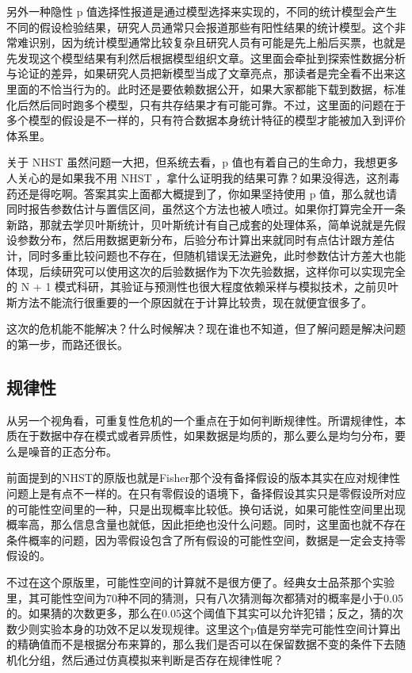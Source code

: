 \documentclass[]{tufte-book}
\begin{document}
另外一种隐性 p 值选择性报道是通过模型选择来实现的，不同的统计模型会产生不同的假设检验结果，研究人员通常只会报道那些有阳性结果的统计模型。这个非常难识别，因为统计模型通常比较复杂且研究人员有可能是先上船后买票，也就是先发现这个模型结果有利然后根据模型组织文章。这里面会牵扯到探索性数据分析与论证的差异，如果研究人员把新模型当成了文章亮点，那读者是完全看不出来这里面的不恰当行为的。此时还是要依赖数据公开，如果大家都能下载到数据，标准化后然后同时跑多个模型，只有共存结果才有可能可靠。不过，这里面的问题在于多个模型的假设是不一样的，只有符合数据本身统计特征的模型才能被加入到评价体系里。

关于 NHST 虽然问题一大把，但系统去看，p 值也有着自己的生命力，我想更多人关心的是如果我不用 NHST ，拿什么证明我的结果可靠？如果没得选，这剂毒药还是得吃啊。答案其实上面都大概提到了，你如果坚持使用 p 值，那么就也请同时报告参数估计与置信区间，虽然这个方法也被人喷过。如果你打算完全开一条新路，那就去学贝叶斯统计，贝叶斯统计有自己成套的处理体系，简单说就是先假设参数分布，然后用数据更新分布，后验分布计算出来就同时有点估计跟方差估计，同时多重比较问题也不存在，但随机错误无法避免，此时参数估计方差大也能体现，后续研究可以使用这次的后验数据作为下次先验数据，这样你可以实现完全的 N + 1 模式科研，其验证与预测性也很大程度依赖采样与模拟技术，之前贝叶斯方法不能流行很重要的一个原因就在于计算比较贵，现在就便宜很多了。

这次的危机能不能解决？什么时候解决？现在谁也不知道，但了解问题是解决问题的第一步，而路还很长。

\hypertarget{ux89c4ux5f8bux6027}{%
\subsection{规律性}\label{ux89c4ux5f8bux6027}}

从另一个视角看，可重复性危机的一个重点在于如何判断规律性。所谓规律性，本质在于数据中存在模式或者异质性，如果数据是均质的，那么要么是均匀分布，要么是噪音的正态分布。

前面提到的NHST的原版也就是Fisher那个没有备择假设的版本其实在应对规律性问题上是有点不一样的。在只有零假设的语境下，备择假设其实只是零假设所对应的可能性空间里的一种，只是出现概率比较低。换句话说，如果可能性空间里出现概率高，那么信息含量也就低，因此拒绝也没什么问题。同时，这里面也就不存在条件概率的问题，因为零假设包含了所有假设的可能性空间，数据是一定会支持零假设的。

不过在这个原版里，可能性空间的计算就不是很方便了。经典女士品茶那个实验里，其可能性空间为70种不同的猜测，只有八次猜测每次都猜对的概率是小于0.05的。如果猜的次数更多，那么在0.05这个阈值下其实可以允许犯错；反之，猜的次数少则实验本身的功效不足以发现规律。这里这个p值是穷举完可能性空间计算出的精确值而不是根据分布来算的，那么我们是否可以在保留数据不变的条件下去随机化分组，然后通过仿真模拟来判断是否存在规律性呢？
\end{document}
